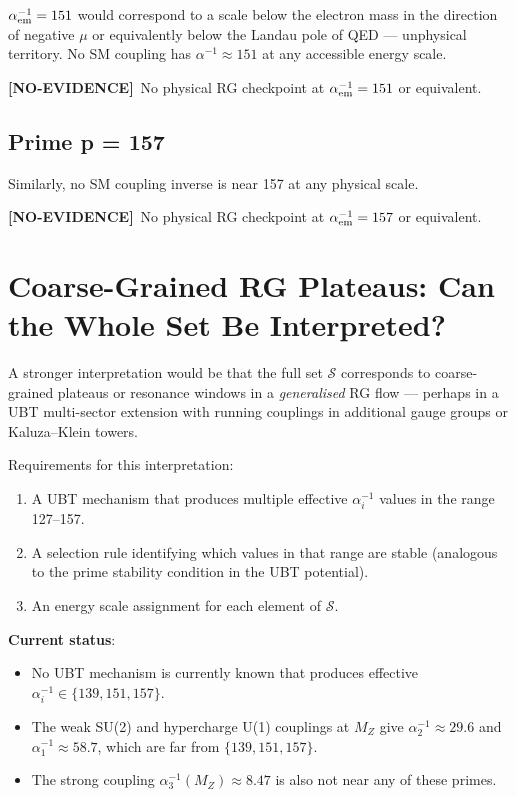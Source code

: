 \documentclass[12pt,a4paper]{article}
\theoremstyle{definition}
\theoremstyle{remark}
\newcommand{\noev}{\textcolor{red!65!black}{\textbf{[NO-EVIDENCE]}}}
\begin{document}
$\alpha_{\rm em}^{-1} = 151$ would correspond to a scale below the electron
mass in the direction of negative $\mu$ or equivalently below the Landau pole
of QED — unphysical territory.  No SM coupling has $\alpha^{-1} \approx 151$
at any accessible energy scale.

\noev\ No physical RG checkpoint at $\alpha_{\rm em}^{-1} = 151$ or equivalent.

\subsection{Prime p = 157}

Similarly, no SM coupling inverse is near 157 at any physical scale.

\noev\ No physical RG checkpoint at $\alpha_{\rm em}^{-1} = 157$ or equivalent.

\section{Coarse-Grained RG Plateaus: Can the Whole Set Be Interpreted?}

A stronger interpretation would be that the full set $\mathcal{S}$ corresponds
to coarse-grained plateaus or resonance windows in a \emph{generalised} RG
flow — perhaps in a UBT multi-sector extension with running couplings in
additional gauge groups or Kaluza--Klein towers.

Requirements for this interpretation:
\begin{enumerate}
\item A UBT mechanism that produces multiple effective $\alpha_i^{-1}$ values
      in the range 127–157.
\item A selection rule identifying which values in that range are stable
      (analogous to the prime stability condition in the UBT potential).
\item An energy scale assignment for each element of $\mathcal{S}$.
\end{enumerate}

\textbf{Current status}:
\begin{itemize}
\item No UBT mechanism is currently known that produces effective
      $\alpha_i^{-1} \in \{139, 151, 157\}$.
\item The weak SU(2) and hypercharge U(1) couplings at $M_Z$ give
      $\alpha_2^{-1} \approx 29.6$ and $\alpha_1^{-1} \approx 58.7$,
      which are far from $\{139, 151, 157\}$.
\item The strong coupling $\alpha_3^{-1}(M_Z) \approx 8.47$ is also not near
      any of these primes.
\end{itemize}
\end{document}
